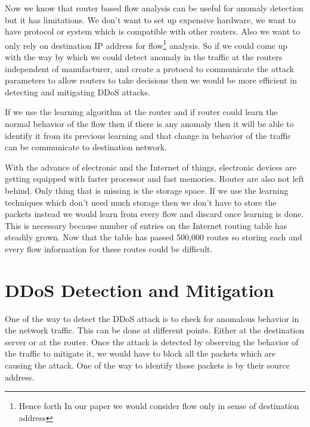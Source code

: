 \documentclass[10pt,oneside,a4paper]{article}
\begin{document}
Now we know that router based flow analysis can be useful for anomaly detection but it has limitations. We don't want to set up expensive hardware, we want to have protocol or system which is compatible with other routers. Also we want to only rely on destination IP address for flow\footnote{Hence forth In our paper we would consider flow only in sense of destination address} analysis. So if we could come up with the way by which we could detect anomaly in the traffic at the routers independent of manufacturer, and create a protocol to communicate the attack parameters to allow routers to take decisions then we would be more efficient in detecting and mitigating DDoS attacks.

If we use the learning algorithm at the router and if router could learn the normal behavior of the flow then if there is any anomaly then it will be able to identify it from its previous learning and that change in behavior of the traffic can be communicate to destination network.

With the advance of electronic and the Internet of things, electronic devices are getting equipped with faster processor and fast memories. Router are also not left behind. Only thing that is missing is the storage space. If we use the learning techniques which don't need much storage then we don't have to store the packets instead we would learn from every flow and discard once learning is done. This is necessary because number of entries on the Internet routing table has steadily grown. Now that the table has passed 500,000 routes\cite{routingtablesize} so storing each and every flow information for these routes could be difficult.\par

\section{DDoS Detection and Mitigation}
One of the way to detect the DDoS attack is to check for anomalous behavior in the network traffic. This can be done at different points. Either at the destination server or at the router. Once the attack is detected by observing the behavior of the traffic to mitigate it, we would have to block all the packets which are causing the attack. One of the way to identify those packets is by their source address.
\end{document}
